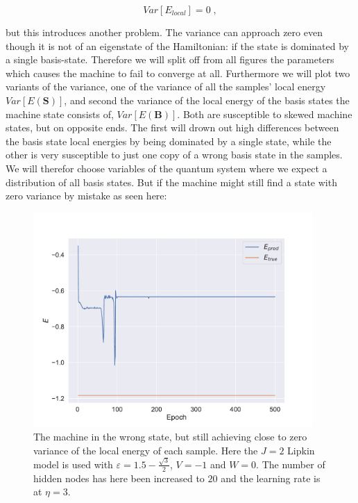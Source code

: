 $$Var[E_{local}] = 0 \;,$$

but this introduces another problem. The variance can approach zero even though it is not of an eigenstate of the Hamiltonian: if the state is dominated by a single basis-state. Therefore we will split off from all figures the parameters which causes the machine to fail to converge at all. Furthermore we will plot two variants of the variance, one of the variance of all the samples' local energy $Var[E(\boldsymbol{S})]$, and second the variance of the local energy of the basis states the machine state consists of, $Var[E(\boldsymbol{B})]$. Both are susceptible to skewed machine states, but on opposite ends. The first will drown out high differences between the basis state local energies by being dominated by a single state, while the other is very susceptible to just one copy of a wrong basis state in the samples. We will therefor choose variables of the quantum system where we expect a distribution of all basis states. But if the machine might still find a state with zero variance by mistake as seen here:

\def \impJ {2}
\def \impeps {1.5 - \frac{\sqrt{3}}{2}}
\def \impV {-1}
\def \impW {0}
\def \impk {1}

\begin{figure}[H]
  \begin{center}
    \includegraphics[width=0.95\textwidth]{Figures/Plots/OPt/wrong_state.pdf}
  \end{center}
  \caption{The machine in the wrong state, but still achieving close to zero variance of the local energy of each sample. Here the $J = \impJ$ Lipkin model is used with $\varepsilon = \impeps$, $V = \impV$ and $W = \impW$. The number of hidden nodes has here been increased to $20$ and the learning rate is at $\eta = 3$.}\label{fig:wrong_state}
\end{figure}

